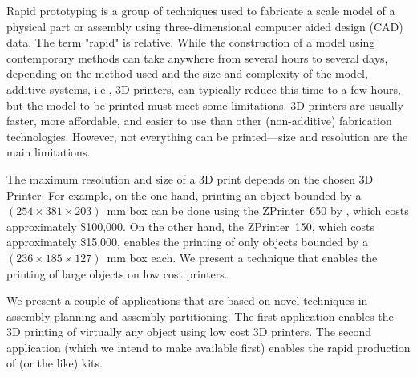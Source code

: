 \documentclass[11pt]{article}
\begin{document}
Rapid prototyping is a group of techniques used to fabricate a scale
model of a physical part or assembly using three-dimensional computer
aided design (CAD) data. The term "rapid" is relative. While the
construction of a model using contemporary methods can take anywhere
from several hours to several days, depending on the method used and
the size and complexity of the model, additive systems, i.e., 3D
printers, can typically reduce this time to a few hours, but the model
to be printed must meet some limitations. 3D printers are usually
faster, more affordable, and easier to use than other (non-additive)
fabrication technologies. However, not everything can be
printed---size and resolution are the main limitations. 

The maximum resolution and size of a 3D print depends on the chosen 3D
Printer. For example, on the one hand, printing an object bounded by a
$(254 \times 381 \times 203)$~mm box can be done using the
ZPrinter\textregistered{}~650 by \zcorp{}, which costs approximately
\$100,000. On the other hand, the ZPrinter\textregistered{}~150, which
costs approximately \$15,000, enables the printing of only objects
bounded by a $(236 \times 185 \times 127)$~mm box each. We present a
technique that enables the printing of large objects on low cost
printers.

We present a couple of applications that are based on novel techniques
in assembly planning and assembly partitioning. The first application
enables the 3D printing of virtually any object using low cost 3D
printers. The second application (which we intend to make
available first) enables the rapid production of \lego{} (or the like)
kits.



\end{document}
